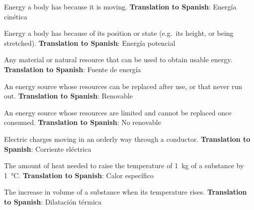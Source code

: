 \begin{vocabulary}
    Energy a body has because it is moving. \newline
    \textbf{Translation to Spanish}: Energía cinética
\end{vocabulary}

\begin{vocabulary}
    Energy a body has because of its position or state (e.g.\ its height, or being stretched). \newline
    \textbf{Translation to Spanish}: Energía potencial
\end{vocabulary}

\begin{vocabulary}
    Any material or natural resource that can be used to obtain usable energy. \newline
    \textbf{Translation to Spanish}: Fuente de energía
\end{vocabulary}

\begin{vocabulary}[Renewable]
    An energy source whose resources can be replaced after use, or that never run out. \newline
    \textbf{Translation to Spanish}: Renovable
\end{vocabulary}

\begin{vocabulary}
    An energy source whose resources are limited and cannot be replaced once consumed. \newline
    \textbf{Translation to Spanish}: No renovable
\end{vocabulary}

\begin{vocabulary}
    Electric charges moving in an orderly way through a conductor. \newline
    \textbf{Translation to Spanish}: Corriente eléctrica
\end{vocabulary}

\begin{vocabulary}
    The amount of heat needed to raise the temperature of \qty{1}{\kg} of a substance by \qty{1}{\celsius}. \newline
    \textbf{Translation to Spanish}: Calor específico
\end{vocabulary}

\begin{vocabulary}
    The increase in volume of a substance when its temperature rises. \newline
    \textbf{Translation to Spanish}: Dilatación térmica
\end{vocabulary}


